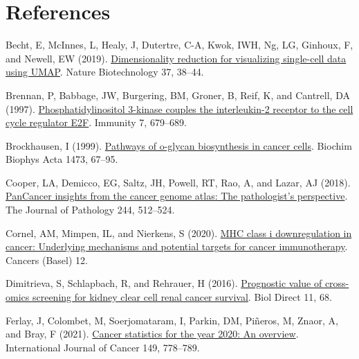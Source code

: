 \documentclass[
  parskip,
  oneside]{scrreprt}
\newlength{\cslhangindent}
\newlength{\cslentryspacingunit} %
\newenvironment{CSLReferences}[2] %
 {%
  \setlength{\parindent}{0pt}
  \ifodd #1
  \let\oldpar\par
  \def\par{\hangindent=\cslhangindent\oldpar}
  \fi
  \setlength{\parskip}{#2\cslentryspacingunit}
 }%
 {}
\begin{document}
\hypertarget{references}{%
\chapter{References}\label{references}}

\hypertarget{refs}{}
\begin{CSLReferences}{0}{0}
\leavevmode{}%
Becht, E, McInnes, L, Healy, J, Dutertre, C-A, Kwok, IWH, Ng, LG,
Ginhoux, F, and Newell, EW (2019).
\href{https://doi.org/10.1038/nbt.4314}{Dimensionality reduction for
visualizing single-cell data using UMAP}. Nature Biotechnology 37,
38--44.

\leavevmode{}%
Brennan, P, Babbage, JW, Burgering, BM, Groner, B, Reif, K, and
Cantrell, DA (1997).
\href{https://doi.org/10.1016/s1074-7613(00)80388-x}{Phosphatidylinositol
3-kinase couples the interleukin-2 receptor to the cell cycle regulator
E2F}. Immunity 7, 679--689.

\leavevmode{}%
Brockhausen, I (1999).
\href{https://doi.org/10.1016/s0304-4165(99)00170-1}{Pathways of
o-glycan biosynthesis in cancer cells}. Biochim Biophys Acta 1473,
67--95.

\leavevmode{}%
Cooper, LA, Demicco, EG, Saltz, JH, Powell, RT, Rao, A, and Lazar, AJ
(2018). \href{https://doi.org/10.1002/path.5028}{PanCancer insights from
the cancer genome atlas: The pathologist's perspective}. The Journal of
Pathology 244, 512--524.

\leavevmode{}%
Cornel, AM, Mimpen, IL, and Nierkens, S (2020).
\href{https://doi.org/10.3390/cancers12071760}{MHC class i
downregulation in cancer: Underlying mechanisms and potential targets
for cancer immunotherapy}. Cancers (Basel) 12.

\leavevmode{}%
Dimitrieva, S, Schlapbach, R, and Rehrauer, H (2016).
\href{https://doi.org/10.1186/s13062-016-0170-1}{Prognostic value of
cross-omics screening for kidney clear cell renal cancer survival}. Biol
Direct 11, 68.

\leavevmode{}%
Ferlay, J, Colombet, M, Soerjomataram, I, Parkin, DM, Piñeros, M, Znaor,
A, and Bray, F (2021). \href{https://doi.org/10.1002/ijc.33588}{Cancer
statistics for the year 2020: An overview}. International Journal of
Cancer 149, 778--789.


\end{CSLReferences}
\end{document}
